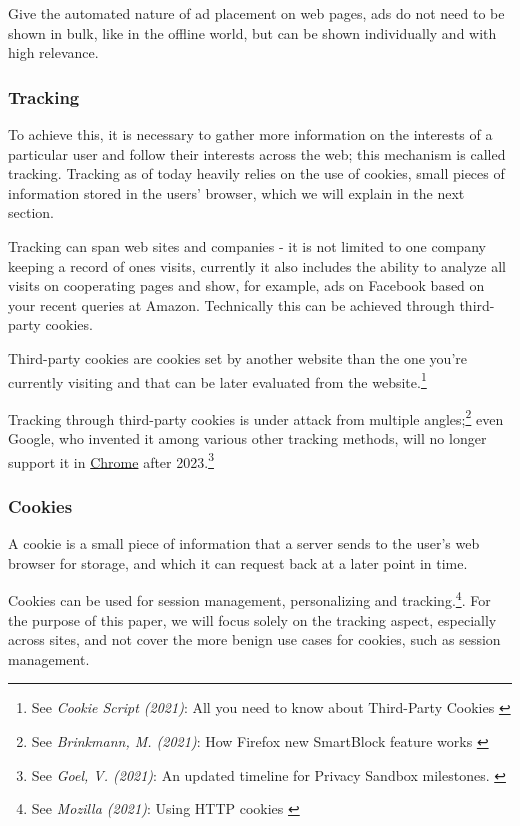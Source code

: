 Give the automated nature of ad placement on web pages, ads do not need to be shown in bulk, like in the offline world, but can be shown individually and with high relevance.

\subsubsection{Tracking}

To achieve this, it is necessary to gather more information on the interests of a particular user and follow their interests across the web; this mechanism is called tracking. Tracking as of today heavily relies on the use of cookies, small pieces of information stored in the users' browser, which we will explain in the next section.

Tracking can span web sites and companies - it is not limited to one company keeping a record of ones visits, currently it also includes the ability to analyze all visits on cooperating pages and show, for example, ads on Facebook based on your recent queries at Amazon. Technically this can be achieved through third-party cookies.

Third-party cookies are cookies set by another website than the one you're currently visiting and that can be later evaluated from the website.\footnote{See \textit{Cookie Script (2021)}: All you need to know about Third-Party Cookies \cite{mozillaBlog}}

Tracking through third-party cookies is under attack from multiple angles;\footnote{See \textit{Brinkmann, M. (2021)}: How Firefox new SmartBlock feature works \cite{mozillaBlog}} even Google, who invented it among various other tracking methods, will no longer support it in \href{https://www.google.com/chrome/}{Chrome} after 2023.\footnote{See \textit{Goel, V. (2021)}: An updated timeline for Privacy Sandbox milestones. \cite{sandboxDelay}}

\subsubsection{Cookies}

A cookie is a small piece of information that a server sends to the user's web browser for storage, and which it can request back at a later point in time.

Cookies can be used for session management, personalizing and tracking.\footnote{See \textit{Mozilla (2021)}: Using HTTP cookies \cite{usingCookies}}. For the purpose of this paper, we will focus solely on the tracking aspect, especially across sites, and not cover the more benign use cases for cookies, such as session management.

